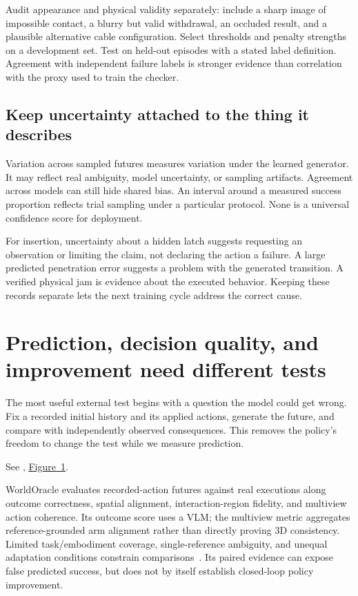 Audit appearance and physical validity separately: include a sharp image of impossible contact, a blurry but valid withdrawal, an occluded result, and a plausible alternative cable configuration. Select thresholds and penalty strengths on a development set. Test on held-out episodes with a stated label definition. Agreement with independent failure labels is stronger evidence than correlation with the proxy used to train the checker.

\subsection{Keep uncertainty attached to the thing it describes}
Variation across sampled futures measures variation under the learned generator. It may reflect real ambiguity, model uncertainty, or sampling artifacts. Agreement across models can still hide shared bias. An interval around a measured success proportion reflects trial sampling under a particular protocol. None is a universal confidence score for deployment.

For insertion, uncertainty about a hidden latch suggests requesting an observation or limiting the claim, not declaring the action a failure. A large predicted penetration error suggests a problem with the generated transition. A verified physical jam is evidence about the executed behavior. Keeping these records separate lets the next training cycle address the correct cause.

\section{Prediction, decision quality, and improvement need different tests}
The most useful external test begins with a question the model could get wrong. Fix a recorded initial history and its applied actions, generate the future, and compare with independently observed consequences. This removes the policy's freedom to change the test while we measure prediction.

\noindent See \citet{worldoracle}, \href{https://arxiv.org/pdf/2610.18826v4}{Figure~1}.


WorldOracle evaluates recorded-action futures against real executions along outcome correctness, spatial alignment, interaction-region fidelity, and multiview action coherence. Its outcome score uses a VLM; the multiview metric aggregates reference-grounded arm alignment rather than directly proving 3D consistency. Limited task/embodiment coverage, single-reference ambiguity, and unequal adaptation conditions constrain comparisons~\citep[Sec.~3 and App.~F]{worldoracle}. Its paired evidence can expose false predicted success, but does not by itself establish closed-loop policy improvement.

